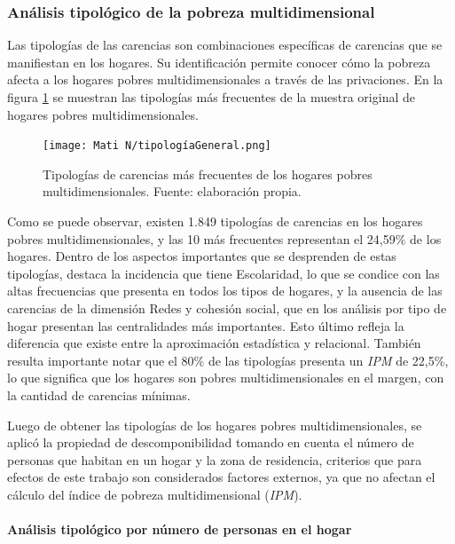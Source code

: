 \documentclass[12pt,letterpaper,spanish]{article}
\begin{document}
\subsubsection{Análisis tipológico de la pobreza multidimensional}
Las tipologías de las carencias son combinaciones específicas de carencias que se manifiestan en los hogares. Su identificación permite conocer cómo la pobreza afecta a los hogares pobres multidimensionales a través de las privaciones. En la figura \ref{TipGen} se muestran las tipologías más frecuentes de la muestra original de hogares pobres multidimensionales.
\begin{figure}[H]
    \centering
    \texttt{[image: Mati N/tipologíaGeneral.png]}
    \caption{Tipologías de carencias más frecuentes de los hogares pobres multidimensionales. Fuente: elaboración propia.}
    \label{TipGen}
\end{figure}
Como se puede observar, existen 1.849 tipologías de carencias en los hogares pobres multidimensionales, y las 10 más frecuentes representan el 24,59\% de los hogares. Dentro de los aspectos importantes que se desprenden de estas tipologías, destaca la incidencia que tiene Escolaridad, lo que se condice con las altas frecuencias que presenta en todos los tipos de hogares, y la ausencia de las carencias de la dimensión Redes y cohesión social, que en los análisis por tipo de hogar presentan las centralidades más importantes. Esto último refleja la diferencia que existe entre la aproximación estadística y relacional. También resulta importante notar que el 80\% de las tipologías presenta un \textit{IPM} de 22,5\%, lo que significa que los hogares son pobres multidimensionales en el margen, con la cantidad de carencias mínimas.

Luego de obtener las tipologías de los hogares pobres multidimensionales, se aplicó la propiedad de descomponibilidad tomando en cuenta el número de personas que habitan en un hogar y la zona de residencia, criterios que para efectos de este trabajo son considerados factores externos, ya que no afectan el cálculo del índice de pobreza multidimensional (\textit{IPM}).

\paragraph{Análisis tipológico por número de personas en el hogar}
\end{document}
